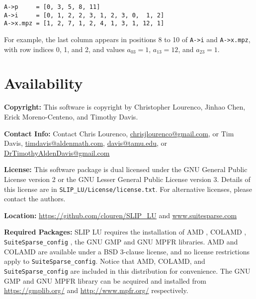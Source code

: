 \documentclass[12pt]{article}
\theoremstyle{definition}
\begin{document}
\begin{verbatim}
A->p     = [0, 3, 5, 8, 11]
A->i     = [0, 1, 2, 2, 3, 1, 2, 3, 0,  1, 2]
A->x.mpz = [1, 2, 7, 1, 2, 4, 1, 3, 1, 12, 1]
\end{verbatim}

For example, the last column appears in positions 8 to 10 of \verb|A->i| and
\verb|A->x.mpz|, with row indices 0, 1, and 2, and values $a_{03}=1$,
$a_{13}=12$, and $a_{23}=1$.

\section{Availability}

\textbf{Copyright:} This software is copyright by Christopher Lourenco, Jinhao
Chen, Erick Moreno-Centeno, and Timothy Davis.

\noindent \textbf{Contact Info:} Contact Chris Lourenco,
\href{mailto:chrisjlourenco@gmail.com}{chrisjlourenco@gmail.com}, or Tim Davis,
\href{mailto:timdavis@aldenmath.com}{timdavis@aldenmath.com},
\href{mailto:davis@tamu.edu}{davis@tamu.edu}, or
\href{DrTimothyAldenDavis@gmail.com}{DrTimothyAldenDavis@gmail.com}

\noindent \textbf{License:} This software package is dual licensed under the
GNU General Public License version 2 or the GNU Lesser General Public License
version 3. Details of this license are in \verb|SLIP_LU/License/license.txt|.
For alternative licenses, please contact the authors.

\noindent \textbf{Location:} \url{https://github.com/clouren/SLIP_LU} and
\url{www.suitesparse.com}

\noindent \textbf{Required Packages:} SLIP LU requires the installation of AMD
\cite{amestoy1996approximate,amestoy2004algorithmamd}, COLAMD
\cite{davis2004column,davis2004algorithmcolamd}, \verb|SuiteSparse_config|
\cite{davis2020suitesparse}, the GNU GMP \cite{granlund2015gnu} and GNU MPFR
\cite{fousse2007mpfr} libraries.  AMD and COLAMD are available under a BSD
3-clause license, and no license restrictions apply to
\verb|SuiteSparse_config|.  Notice that AMD, COLAMD, and
\verb|SuiteSparse_config| are included in this distribution for
convenience. The GNU GMP and GNU MPFR library can be acquired and installed
from \url{https://gmplib.org/} and \url{http://www.mpfr.org/} respectively.
\end{document}
